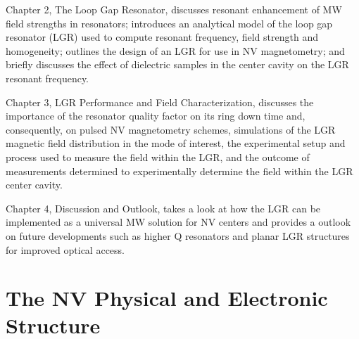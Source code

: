 Chapter 2, The Loop Gap Resonator, discusses resonant enhancement of MW field strengths in resonators; introduces an analytical model of the loop gap resonator (LGR) used to compute resonant frequency, field strength and homogeneity; outlines the design of an LGR for use in NV magnetometry; and briefly discusses the effect of dielectric samples in the center cavity on the LGR resonant frequency.


Chapter 3, LGR Performance and Field Characterization, discusses the importance of the resonator quality factor on its ring down time and, consequently, on pulsed NV magnetometry schemes, simulations of the LGR magnetic field distribution in the mode of interest, the experimental setup and process used to measure the field within the LGR, and the outcome of measurements determined to experimentally determine the field within the LGR center cavity.  

Chapter 4, Discussion and Outlook, takes a look at how the LGR can be implemented as a universal MW solution for NV centers and   provides a outlook on future developments such as higher Q resonators and planar LGR structures for improved optical access.


\section{The NV Physical and Electronic Structure} \label{sec:NVP}


